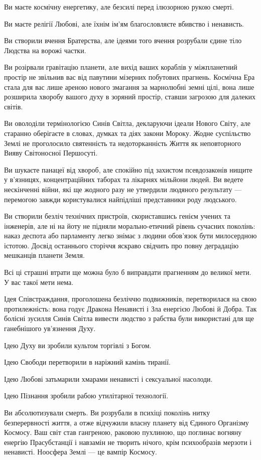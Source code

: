 Ви маєте космічну енергетику, але безсилі перед ілюзорною рукою смерті.

Ви маєте релігії Любові, але їхнім ім’ям благословляєте вбивство і ненависть.

Ви створили вчення Братерства, але ідеями того вчення розрубали єдине тіло
Людства на ворожі частки.

Ви розірвали гравітацію планети, але вихід ваших кораблів у міжпланетний
простір не звільнив вас від павутини мізерних побутових прагнень. Космічна Ера
стала для вас лише ареною нового змагання за марнолюбні земні цілі, вона лише
розширила хворобу вашого духу в зоряний простір, ставши загрозою для далеких
світів.

Ви оволоділи термінологією Синів Світла, декларуючи ідеали Нового Світу, але
старанно оберігаєте в словах, думках та діях закони Мороку. Жодне суспільство
Землі не проголосило святенність та недоторканність Життя як неповторного Вияву
Світоносної Першосуті.

Ви шукаєте панацеї від хвороб, але спокійно під захистом псевдозаконів нищите у
в’язницях, концентраційних таборах та лікарнях мільйони людей. Ви ведете
нескінченні війни, які ще жодного разу не утвердили людяного результату —
перемогою завжди користувалися найпідліші представники роду людського.

Ви створили безліч технічних пристроїв, скориставшись генієм учених та
інженерів, але ні на йоту не підняли морально-етичний рівень сучасних поколінь:
наказ деспота або парламенту легко знімає з людини обов’язок бути милосердною
істотою. Досвід останнього сторіччя яскраво свідчить про повну деградацію
мешканців планети Земля.

Всі ці страшні втрати ще можна було б виправдати прагненням до великої мети. У
вас такої мети нема.

Ідея Співстраждання, проголошена безліччю подвижників, перетворилася на свою
протилежність: вона годує Дракона Ненависті і Зла енергією Любові й Добра. Так
болісні зусилля Синів Світла вивести людство з рабства були використані для ще
ганебнішого ув’язнення Духу.

Ідею Духу ви зробили культом торгівлі з Богом.

Ідею Свободи перетворили в наріжний камінь тиранії.

Ідею Любові затьмарили хмарами ненависті і сексуальної насолоди.

Ідею Пізнання зробили рабою утилітарної технології.

Ви абсолютизували смерть. Ви розрубали в психіці поколінь нитку безперервності
життя, а отже відчужили власну планету від Єдиного Організму Космосу. Ваш світ
став гангреною, раковою пухлиною, що поглинає вогняну енергію Прасубстанції і
навзамін не творить нічого, крім психообразів мерзоти і ненависті. Ноосфера
Землі — це вампір Космосу.

